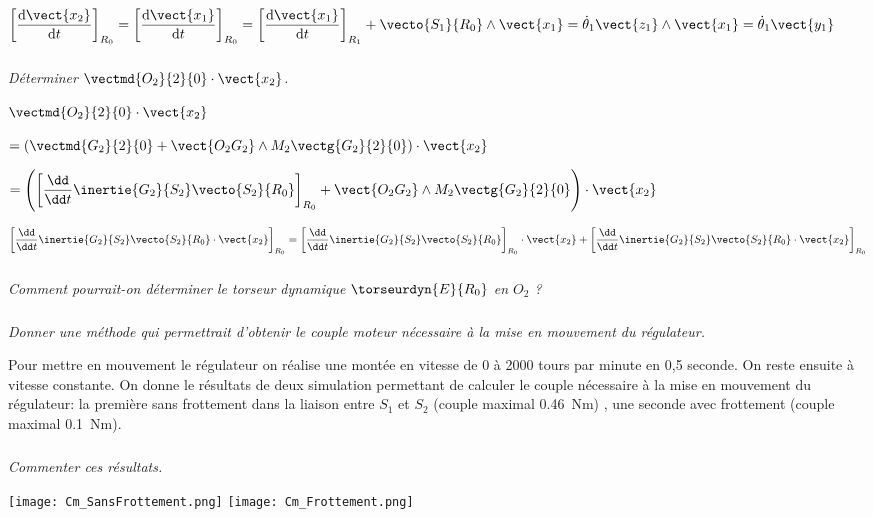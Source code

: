 \begin{multicols}{2}
\begin{corrige}
$\left[\dfrac{\text{d} \vect{x_2}}{\text{d} t}\right]_{R_0}
=\left[\dfrac{\text{d} \vect{x_1}}{\text{d} t}\right]_{R_0}
=\left[\dfrac{\text{d} \vect{x_1}}{\text{d} t}\right]_{R_1} + \vecto{S_1}{R_0}\wedge\vect{x_1}
=\dot{\theta}_1 \vect{z_1} \wedge  \vect{x_1}
=\dot{\theta}_1 \vect{y_1}$




\end{corrige}
\else
\fi


\subparagraph{}\textit{Déterminer $\vectmd{O_2}{2}{0}\cdot \vect{x_2}$.}
\ifprof
\begin{corrige}


$\vectmd{O_2}{2}{0}\cdot \vect{x_2}$

$= \left( \vectmd{G_2}{2}{0}+\vect{O_2G_2}\wedge M_2\vectg{G_2}{2}{0}\right)\cdot \vect{x_2}$

$= \left( \left[\dfrac{\dd}{\dd t}\inertie{G_2}{S_2}\vecto{S_2}{R_0}\right]_{R_0}
+\vect{O_2G_2}\wedge M_2\vectg{G_2}{2}{0}\right)\cdot \vect{x_2}$

$\left[\dfrac{\dd}{\dd t}\inertie{G_2}{S_2}\vecto{S_2}{R_0} \cdot \vect{x_2} \right]_{R_0}
=\left[\dfrac{\dd}{\dd t}\inertie{G_2}{S_2}\vecto{S_2}{R_0}  \right]_{R_0}\cdot \vect{x_2}+\left[\dfrac{\dd}{\dd t}\inertie{G_2}{S_2}\vecto{S_2}{R_0} \cdot \vect{x_2} \right]_{R_0}$
\end{corrige}
\else
\fi
\subparagraph{}\textit{Comment pourrait-on déterminer le torseur dynamique  $\torseurdyn{E}{R_0}$ en $O_2$ ?}

\subparagraph{}\textit{Donner une méthode qui permettrait d'obtenir le couple moteur nécessaire à la mise en mouvement du régulateur.}

Pour mettre en mouvement le régulateur on réalise une montée en vitesse de 0 à 2000 tours par minute en 0,5 seconde.  On reste ensuite à vitesse constante. On donne le résultats de deux simulation permettant de calculer le couple nécessaire à la mise en mouvement du régulateur: la première sans frottement dans la liaison entre $S_1$ et $S_2$ (couple maximal \SI{0,46}{Nm}) , une seconde avec frottement (couple maximal \SI{0,1}{Nm}). 

\subparagraph{}\textit{Commenter ces résultats. }



\ifprof
\else
\end{multicols}
\fi

\begin{center}
\texttt{[image: Cm\_SansFrottement.png]}
\texttt{[image: Cm\_Frottement.png]}
\end{center}



